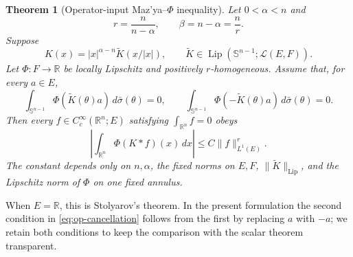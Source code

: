 \documentclass[11pt]{amsart}
\numberwithin{equation}{section}
\newtheorem{theorem}{Theorem}[section]
\theoremstyle{definition}
\theoremstyle{remark}
\newcommand{\R}{\mathbb R}
\newcommand{\Sph}{\mathbb S}
\newcommand{\cL}{\mathcal L}
\newcommand{\norm}[1]{\lVert #1\rVert}
\begin{document}
\begin{theorem}[Operator-input Maz'ya--$\Phi$ inequality]\label{thm:operator-phi}
Let $0<\alpha<n$ and
\[
 r=\frac{n}{n-\alpha},\qquad \beta=n-\alpha=\frac nr.
\]
Suppose
\begin{equation}\label{eq:op-kernel}
 K(x)=|x|^{\alpha-n}\widetilde K(x/|x|),
 \qquad
 \widetilde K\in \operatorname{Lip}(\Sph^{n-1};\cL(E,F)).
\end{equation}
Let $\Phi:F\to\R$ be locally Lipschitz and positively $r$-homogeneous.  Assume
that, for every $a\in E$,
\begin{equation}\label{eq:op-cancellation}
 \int_{\Sph^{n-1}}\Phi(\widetilde K(\theta)a)\,d\bar\sigma(\theta)=0,
 \qquad
 \int_{\Sph^{n-1}}\Phi(-\widetilde K(\theta)a)\,d\bar\sigma(\theta)=0.
\end{equation}
Then every $f\in C_c^\infty(\R^n;E)$ satisfying $\int_{\R^n}f=0$ obeys
\begin{equation}\label{eq:op-phi-estimate}
 \left|\int_{\R^n}\Phi(K*f)(x)\,dx\right|
 \le C\norm{f}_{L^1(E)}^r.
\end{equation}
The constant depends only on $n,\alpha$, the fixed norms on $E,F$,
$\norm{\widetilde K}_{\operatorname{Lip}}$, and the Lipschitz norm of $\Phi$
on one fixed annulus.
\end{theorem}

When $E=\R$, this is Stolyarov's theorem.  In the present formulation the
second condition in \eqref{eq:op-cancellation} follows from the first by
replacing $a$ with $-a$; we retain both conditions to keep the comparison with
the scalar theorem transparent.
\end{document}
